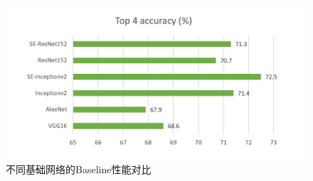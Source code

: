 \begin{figure}[h]
  \centering
  \includegraphics[width=0.8\linewidth]{Img/baseline.png}
  \caption{不同基础网络的Baseline性能对比}
  \label{fig:baseline}
\end{figure}
